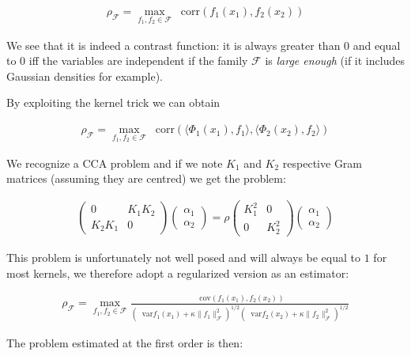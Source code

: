 \documentclass[a4paper,BCOR=5mm,oneside,openany]{scrreprt}
\newcommand*\cov{\mathop{}\!\mathrm{cov}}
\newcommand*\var{\mathop{}\!\mathrm{var}}
\newcommand*\corr{\mathop{}\!\mathrm{corr}}
\begin{document}
\begin{align*}
	\rho_\mathcal{F} = \max_{f_1, f_2 \in \mathcal{F}} \corr (f_1(x_1), f_2 (x_2))
\end{align*}

We see that it is indeed a contrast function: it is always greater than $0$ and equal to $0$ iff the variables are independent if the family $\mathcal{F}$ is \emph{large enough} (if it includes Gaussian densities for example).

By exploiting the kernel trick we can obtain

\begin{align*}
	\rho_\mathcal{F} = \max_{f_1, f_2 \in \mathcal{F}} \corr ( \langle \Phi_1 (x_1), f_1 \rangle , \langle \Phi_2 (x_2), f_2 \rangle)
\end{align*}

We recognize a CCA problem and if we note $K_1$ and $K_2$ respective Gram matrices (assuming they are centred) we get the problem:

\begin{align*}
	\begin{pmatrix}
		0 & K_1 K_2 \\
		K_2 K_1 & 0
	\end{pmatrix} \begin{pmatrix}
		\alpha_1 \\ \alpha_2
	\end{pmatrix}
	= \rho \begin{pmatrix}
		K_1^2 & 0 \\
		0 & K_2^2
	\end{pmatrix} \begin{pmatrix}
		\alpha_1 \\ \alpha_2
	\end{pmatrix}
\end{align*}

This problem is unfortunately not well posed and will always be equal to $1$ for most kernels, we therefore adopt a regularized version as an estimator:

\begin{align*}
	\rho_\mathcal{F} = \max_{f_1, f_2 \in \mathcal{F}} \frac{\cov (f_1(x_1), f_2 (x_2))}{(\var f_1 (x_1) + \kappa \lVert f_1 \rVert^2 _\mathcal{F} )^{1/2} (\var f_2 (x_2) + \kappa \lVert f_2 \rVert^2 _\mathcal{F} )^{1/2}}
\end{align*}

The problem estimated at the first order is then:
\end{document}
